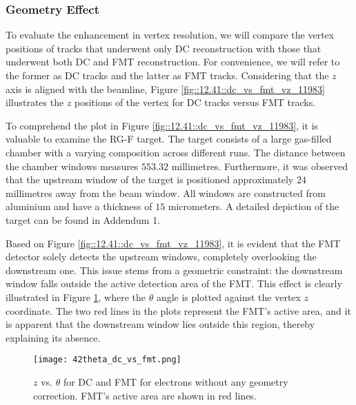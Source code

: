 \subsubsection{Geometry Effect}
\label{12.42::geometry_effect}
    To evaluate the enhancement in vertex resolution, we will compare the vertex positions of tracks that underwent only DC reconstruction with those that underwent both DC and FMT reconstruction.
    For convenience, we will refer to the former as DC tracks and the latter as FMT tracks.
    Considering that the $z$ axis is aligned with the beamline, Figure \ref{fig::12.41::dc_vs_fmt_vz_11983} illustrates the $z$ positions of the vertex for DC tracks versus FMT tracks.

    To comprehend the plot in Figure \ref{fig::12.41::dc_vs_fmt_vz_11983}, it is valuable to examine the RG-F target.
    The target consists of a large gas-filled chamber with a varying composition across different runs.
    The distance between the chamber windows measures $553.32$ millimetres.
    Furthermore, it was observed that the upstream window of the target is positioned approximately $24$ millimetres away from the beam window.
    All windows are constructed from aluminium and have a thickness of $15$ micrometers.
    A detailed depiction of the target can be found in Addendum 1.

    Based on Figure \ref{fig::12.41::dc_vs_fmt_vz_11983}, it is evident that the FMT detector solely detects the upstream windows, completely overlooking the downstream one.
    This issue stems from a geometric constraint: the downstream window falls outside the active detection area of the FMT.
    This effect is clearly illustrated in Figure \ref{eq::12.42::vz_vs_theta}, where the $\theta$ angle is plotted against the vertex $z$ coordinate.
    The two red lines in the plots represent the FMT's active area, and it is apparent that the downstream window lies outside this region, thereby explaining its absence.

    \begin{figure}[t!]
        \texttt{[image: 42theta\_dc\_vs\_fmt.png]}
        \caption[$z$ vs. $\theta$ for DC and FMT]
        {$z$ vs. $\theta$ for DC and FMT for electrons without any geometry correction.
        FMT's active area are shown in red lines.}
        \label{eq::12.42::vz_vs_theta}
    \end{figure}

